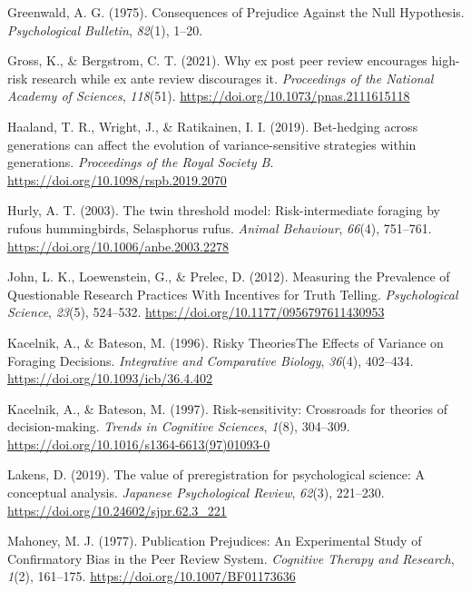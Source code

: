 \documentclass[british,,man,mask,floatsintext]{apa6}
\begin{document}
\leavevmode\hypertarget{ref-Greenwald1975}{}%
Greenwald, A. G. (1975). Consequences of Prejudice Against the Null Hypothesis. \emph{Psychological Bulletin}, \emph{82}(1), 1--20.

\leavevmode\hypertarget{ref-Gross2021}{}%
Gross, K., \& Bergstrom, C. T. (2021). Why ex post peer review encourages high-risk research while ex ante review discourages it. \emph{Proceedings of the National Academy of Sciences}, \emph{118}(51). \url{https://doi.org/10.1073/pnas.2111615118}

\leavevmode\hypertarget{ref-Haaland2019}{}%
Haaland, T. R., Wright, J., \& Ratikainen, I. I. (2019). Bet-hedging across generations can affect the evolution of variance-sensitive strategies within generations. \emph{Proceedings of the Royal Society B}. \url{https://doi.org/10.1098/rspb.2019.2070}

\leavevmode\hypertarget{ref-Hurly2003}{}%
Hurly, A. T. (2003). The twin threshold model: Risk-intermediate foraging by rufous hummingbirds, Selasphorus rufus. \emph{Animal Behaviour}, \emph{66}(4), 751--761. \url{https://doi.org/10.1006/anbe.2003.2278}

\leavevmode\hypertarget{ref-John2012}{}%
John, L. K., Loewenstein, G., \& Prelec, D. (2012). Measuring the Prevalence of Questionable Research Practices With Incentives for Truth Telling. \emph{Psychological Science}, \emph{23}(5), 524--532. \url{https://doi.org/10.1177/0956797611430953}

\leavevmode\hypertarget{ref-Kacelnik1996}{}%
Kacelnik, A., \& Bateson, M. (1996). Risky TheoriesThe Effects of Variance on Foraging Decisions. \emph{Integrative and Comparative Biology}, \emph{36}(4), 402--434. \url{https://doi.org/10.1093/icb/36.4.402}

\leavevmode\hypertarget{ref-Kacelnik1997}{}%
Kacelnik, A., \& Bateson, M. (1997). Risk-sensitivity: Crossroads for theories of decision-making. \emph{Trends in Cognitive Sciences}, \emph{1}(8), 304--309. \url{https://doi.org/10.1016/s1364-6613(97)01093-0}

\leavevmode\hypertarget{ref-Lakens2019b}{}%
Lakens, D. (2019). The value of preregistration for psychological science: A conceptual analysis. \emph{Japanese Psychological Review}, \emph{62}(3), 221--230. \url{https://doi.org/10.24602/sjpr.62.3_221}

\leavevmode\hypertarget{ref-Mahoney1977}{}%
Mahoney, M. J. (1977). Publication Prejudices: An Experimental Study of Confirmatory Bias in the Peer Review System. \emph{Cognitive Therapy and Research}, \emph{1}(2), 161--175. \url{https://doi.org/10.1007/BF01173636}
\end{document}
